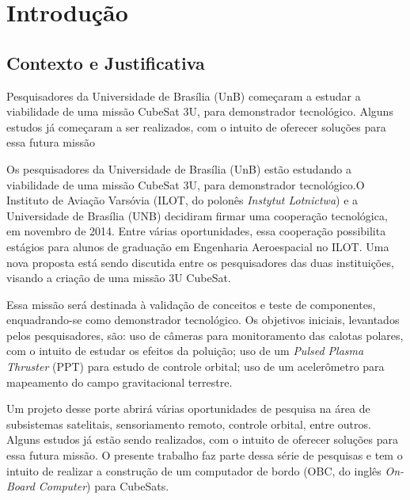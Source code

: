 



\chapter[Introdução]{Introdução}
\section{Contexto e Justificativa}
 
Pesquisadores da Universidade de Brasília (UnB) começaram a estudar a viabilidade de uma missão CubeSat 3U, para demonstrador tecnológico. Alguns estudos já começaram a ser realizados, com o intuito de oferecer soluções para essa futura missão

Os pesquisadores da Universidade de Brasília (UnB) estão estudando a viabilidade de uma missão CubeSat 3U, para demonstrador tecnológico.O Instituto de Aviação Varsóvia (ILOT, do polonês \textit{Instytut Lotnictwa}) e a Universidade de Brasília (UNB) decidiram firmar uma cooperação tecnológica, em novembro de 2014. Entre várias oportunidades, essa cooperação possibilita estágios para alunos de graduação em Engenharia Aeroespacial no ILOT. Uma nova proposta está sendo discutida entre os pesquisadores das duas instituições, visando a criação de uma missão 3U CubeSat.

Essa missão será destinada à validação de conceitos e teste de componentes, enquadrando-se como demonstrador tecnológico. Os objetivos iniciais, levantados pelos pesquisadores, são: uso de câmeras para monitoramento das calotas polares, com o intuito de estudar os efeitos da poluição; uso de um \textit{Pulsed Plasma Thruster} (PPT) para estudo de controle orbital;  uso de um acelerômetro para mapeamento do campo gravitacional terrestre.

Um projeto desse porte abrirá várias oportunidades de pesquisa na área de subsistemas satelitais, sensoriamento remoto, controle orbital, entre outros. Alguns estudos já estão sendo realizados, com o intuito de oferecer soluções para essa futura missão. O presente trabalho faz parte dessa série de pesquisas e tem o intuito de realizar a construção de um computador de bordo (OBC, do inglês \textit{On-Board Computer}) para CubeSats.

